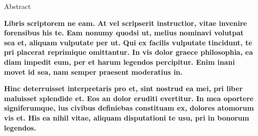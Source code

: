 Abstract

\textbf{Libris scriptorem ne eam. At vel scripserit instructior, vitae invenire forensibus his te. Eam nonumy quodsi ut, melius nominavi volutpat sea et, aliquam vulputate per ut. Qui ex facilis vulputate tincidunt, te pri placerat reprimique omittantur. In vis dolor graece philosophia, ea diam impedit eum, per et harum legendos percipitur. Enim inani movet id sea, nam semper praesent moderatius in.}

\textbf{Hinc deterruisset interpretaris pro et, sint nostrud ea mei, pri liber maluisset splendide et. Eos an dolor eruditi evertitur. In mea oportere signiferumque, ius civibus definiebas constituam ex, dolores atomorum vis et. His ea nihil vitae, aliquam disputationi te usu, pri in bonorum legendos.}
